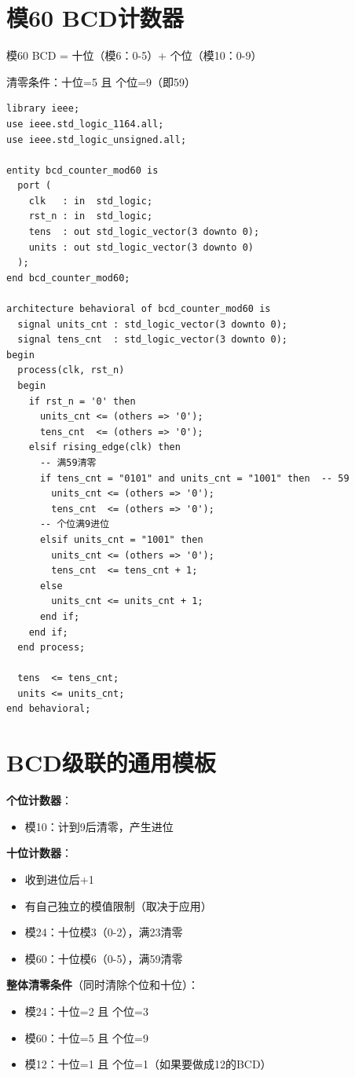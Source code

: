 \section{模60 BCD计数器}

模60 BCD = 十位（模6：0-5）+ 个位（模10：0-9）

清零条件：十位=5 且 个位=9（即59）

\begin{lstlisting}[caption={模60 BCD计数器}]
library ieee;
use ieee.std_logic_1164.all;
use ieee.std_logic_unsigned.all;

entity bcd_counter_mod60 is
  port (
    clk   : in  std_logic;
    rst_n : in  std_logic;
    tens  : out std_logic_vector(3 downto 0);
    units : out std_logic_vector(3 downto 0)
  );
end bcd_counter_mod60;

architecture behavioral of bcd_counter_mod60 is
  signal units_cnt : std_logic_vector(3 downto 0);
  signal tens_cnt  : std_logic_vector(3 downto 0);
begin
  process(clk, rst_n)
  begin
    if rst_n = '0' then
      units_cnt <= (others => '0');
      tens_cnt  <= (others => '0');
    elsif rising_edge(clk) then
      -- 满59清零
      if tens_cnt = "0101" and units_cnt = "1001" then  -- 59
        units_cnt <= (others => '0');
        tens_cnt  <= (others => '0');
      -- 个位满9进位
      elsif units_cnt = "1001" then
        units_cnt <= (others => '0');
        tens_cnt  <= tens_cnt + 1;
      else
        units_cnt <= units_cnt + 1;
      end if;
    end if;
  end process;

  tens  <= tens_cnt;
  units <= units_cnt;
end behavioral;
\end{lstlisting}

\section{BCD级联的通用模板}

\begin{designflow}[多位BCD计数器通用模板]
\textbf{个位计数器}：
\begin{itemize}
  \item 模10：计到9后清零，产生进位
\end{itemize}

\textbf{十位计数器}：
\begin{itemize}
  \item 收到进位后+1
  \item 有自己独立的模值限制（取决于应用）
  \item 模24：十位模3（0-2），满23清零
  \item 模60：十位模6（0-5），满59清零
\end{itemize}

\textbf{整体清零条件}（同时清除个位和十位）：
\begin{itemize}
  \item 模24：十位=2 且 个位=3
  \item 模60：十位=5 且 个位=9
  \item 模12：十位=1 且 个位=1（如果要做成12的BCD）
\end{itemize}
\end{designflow}


